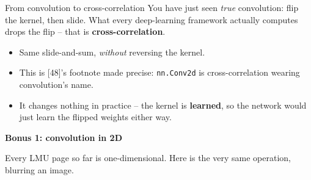 \documentclass[aspectratio=43]{beamer}
\begin{document}


\begin{frame}{From convolution to cross-correlation}
  You have just seen \emph{true} convolution: flip the kernel, then slide. What every
  deep-learning framework actually computes drops the flip -- that is
  \textbf{cross-correlation}.
  \vfill
  \begin{itemize}\small
    \item Same slide-and-sum, \emph{without} reversing the kernel.
    \item This is [48]'s footnote made precise: \texttt{nn.Conv2d} is cross-correlation
      wearing convolution's name.
    \item It changes nothing in practice -- the kernel is \textbf{learned}, so the network
      would just learn the flipped weights either way.
  \end{itemize}
  \vfill
\end{frame}



\begin{frame}[plain]
  \vfill
  \begin{center}
    {\Large\color{popblue}\textbf{Bonus 1: convolution in 2D}}\\[0.9em]
    \begin{minipage}{0.86\textwidth}\centering\small
      Every LMU page so far is one-dimensional. Here is the very same operation, blurring
      an image.
    \end{minipage}
  \end{center}
  \vfill
\end{frame}
\end{document}

